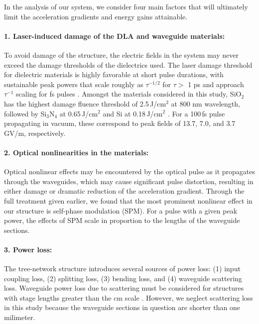 In the analysis of our system, we consider four main factors that will ultimately limit the acceleration gradients and energy gains attainable.

\paragraph{1. Laser-induced damage of the DLA and waveguide materials:}

To avoid damage of the structure, the electric fields in the system may never exceed the damage thresholds of the dielectrics used.  The laser damage threshold for dielectric materials is highly favorable at short pulse durations, with sustainable peak powers that scale roughly as $\tau^{-1/2}$ for $\tau >$ 1 ps and approach $\tau^{-1}$ scaling for fs pulses \cite{stuart1995laser, stuart1996nanosecond}.  Amongst the materials considered in this study, SiO$_2$ has the highest damage fluence threshold of 2.5\,J/cm$^{2}$ at 800 nm wavelength, followed by Si$_3$N$_4$ at 0.65\,J/cm$^{2}$ and Si at 0.18\,J/cm$^{2}$ \cite{soong2012laser}. For a 100\,fs pulse propagating in vacuum, these correspond to peak fields of 13.7, 7.0, and 3.7\,GV/m, respectively.

\paragraph{2. Optical nonlinearities in the materials:}

Optical nonlinear effects may be encountered by the optical pulse as it propagates through the waveguides, which may cause significant pulse distortion, resulting in either damage or dramatic reduction of the acceleration gradient. Through the full treatment given earlier, we found that the most prominent nonlinear effect in our structure is self-phase modulation (SPM).  For a pulse with a given peak power, the effects of SPM scale in proportion to the lengths of the waveguide sections.
 
\paragraph{3. Power loss:}

The tree-network structure introduces several sources of power loss: (1) input coupling loss, (2) splitting loss, (3) bending loss, and (4) waveguide scattering loss.  Waveguide power loss due to scattering must be considered for structures with stage lengths greater than the cm scale \cite{yamada2011silicon}.  However, we neglect scattering loss in this study because the waveguide sections in question are shorter than one milimeter.

